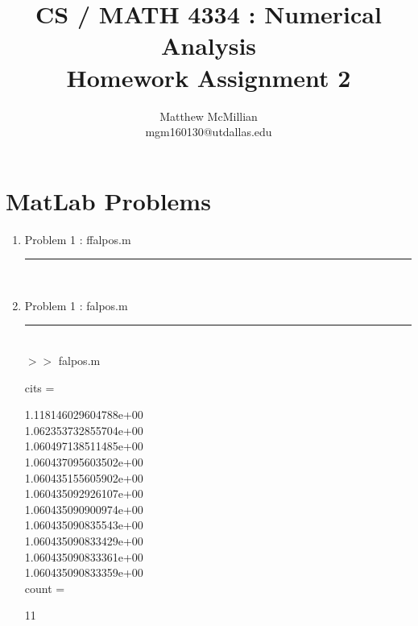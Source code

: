 \documentclass[12pt]{article}
\begin{document}
\title{CS / MATH 4334 : Numerical Analysis\\Homework Assignment 2}
\author{Matthew McMillian\\mgm160130@utdallas.edu}
\maketitle

\section*{MatLab Problems}


\pagebreak

	\begin{enumerate}
	
	\item[] Problem 1 : ffalpos.m \noindent\rule{\textwidth}{1.0pt} \\
	
	
	\item[] Problem 1 : falpos.m \noindent\rule{\textwidth}{1.0pt} \\
		
	
	$>>$ falpos.m 
	\begin{framed}
	cits =

     1.118146029604788e+00\\
     1.062353732855704e+00\\
     1.060497138511485e+00\\
     1.060437095603502e+00\\
     1.060435155605902e+00\\
     1.060435092926107e+00\\
     1.060435090900974e+00\\
     1.060435090835543e+00\\
     1.060435090833429e+00\\
     1.060435090833361e+00\\
     1.060435090833359e+00\\
     
    count =

    11
	\end{framed}
	
	\end{enumerate}
	
\end{document}

